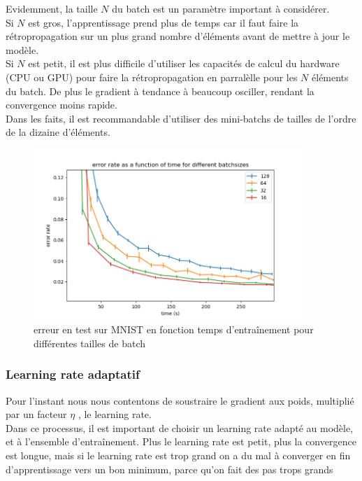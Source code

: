 \newpage

Evidemment, la taille $N$ du batch est un paramètre important à considérer. \\
Si $N$ est gros, l'apprentissage prend plus de temps car il faut faire la rétropropagation sur un plus grand nombre d'éléments avant de mettre à jour le modèle.\\
Si $N$ est petit, il est plus difficile d'utiliser les capacités de calcul du hardware (CPU ou GPU) pour faire la rétropropagation en parralèlle pour les $N$ éléments
du batch. De plus le gradient à tendance à beaucoup osciller, rendant la convergence moins rapide.
\\

Dans les faits, il est recommandable d'utiliser des mini-batchs de tailles de l'ordre de la dizaine d'éléments. 

\begin{figure}[h]
 \centering
 \includegraphics[width=0.9\textwidth]{img/time_vs_batchsize.png}
 \caption{erreur en test sur MNIST en fonction temps d'entraînement pour différentes tailles de batch}
 \label{fig:time_vs_batchsize.png}
\end{figure}

\subsubsection{Learning rate adaptatif}

Pour l'instant nous nous contentons de soustraire le gradient aux poids, multiplié par un facteur $\eta$ , le learning rate.\\
Dans ce processus, il est important de choisir un learning rate adapté au modèle, et à l'ensemble d'entraînement.
Plus le learning rate est petit, plus la convergence est longue, mais si le learning rate est trop grand on a du mal à converger en fin d'apprentissage
vers un bon minimum, parce qu'on fait des pas trops grands

